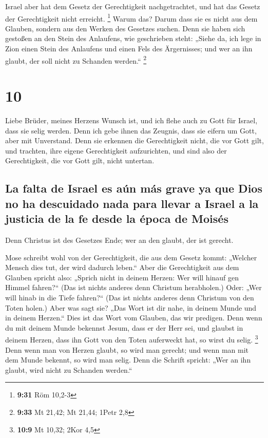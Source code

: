  Israel aber hat dem Gesetz der Gerechtigkeit
nachgetrachtet, und hat das Gesetz der Gerechtigkeit nicht erreicht.
\footnote{\textbf{9:31} Röm 10,2-3}  Warum das? Darum
dass sie es nicht aus dem Glauben, sondern aus den Werken des Gesetzes
suchen. Denn sie haben sich gestoßen an den Stein des Anlaufens,
 wie geschrieben steht: „Siehe da, ich lege in Zion einen
Stein des Anlaufens und einen Fels des Ärgernisses; und wer an ihn
glaubt, der soll nicht zu Schanden werden.`` \footnote{\textbf{9:33} Mt
  21,42; Mt 21,44; 1Petr 2,8}

\hypertarget{section-9}{%
\section{10}\label{section-9}}

 Liebe Brüder, meines Herzens Wunsch ist, und ich flehe
auch zu Gott für Israel, dass sie selig werden.  Denn ich
gebe ihnen das Zeugnis, dass sie eifern um Gott, aber mit Unverstand.
 Denn sie erkennen die Gerechtigkeit nicht, die vor Gott
gilt, und trachten, ihre eigene Gerechtigkeit aufzurichten, und sind
also der Gerechtigkeit, die vor Gott gilt, nicht untertan.

\hypertarget{la-falta-de-israel-es-auxfan-muxe1s-grave-ya-que-dios-no-ha-descuidado-nada-para-llevar-a-israel-a-la-justicia-de-la-fe-desde-la-uxe9poca-de-moisuxe9s}{%
\subsection{La falta de Israel es aún más grave ya que Dios no ha
descuidado nada para llevar a Israel a la justicia de la fe desde la
época de
Moisés}\label{la-falta-de-israel-es-auxfan-muxe1s-grave-ya-que-dios-no-ha-descuidado-nada-para-llevar-a-israel-a-la-justicia-de-la-fe-desde-la-uxe9poca-de-moisuxe9s}}

 Denn Christus ist des Gesetzes Ende; wer an den glaubt,
der ist gerecht.

 Mose schreibt wohl von der Gerechtigkeit, die aus dem
Gesetz kommt: „Welcher Mensch dies tut, der wird dadurch leben.``
 Aber die Gerechtigkeit aus dem Glauben spricht also:
„Sprich nicht in deinem Herzen: Wer will hinauf gen Himmel fahren?{}``
(Das ist nichts anderes denn Christum herabholen.)  Oder:
„Wer will hinab in die Tiefe fahren?{}`` (Das ist nichts anderes denn
Christum von den Toten holen.)  Aber was sagt sie? „Das
Wort ist dir nahe, in deinem Munde und in deinem Herzen.`` Dies ist das
Wort vom Glauben, das wir predigen.  Denn wenn du mit
deinem Munde bekennst Jesum, dass er der Herr sei, und glaubst in deinem
Herzen, dass ihn Gott von den Toten auferweckt hat, so wirst du selig.
\footnote{\textbf{10:9} Mt 10,32; 2Kor 4,5}  Denn wenn
man von Herzen glaubt, so wird man gerecht; und wenn man mit dem Munde
bekennt, so wird man selig.  Denn die Schrift spricht:
„Wer an ihn glaubt, wird nicht zu Schanden werden.``

